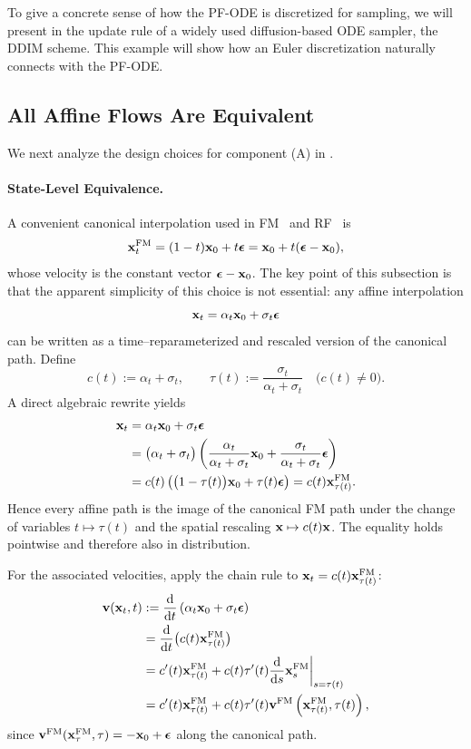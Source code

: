 To give a concrete sense of how the PF-ODE is discretized
for sampling, we will present in  the update rule of a
widely used diffusion-based ODE sampler, the DDIM scheme. This example will show how an Euler discretization naturally connects with the PF-ODE.







\subsection{All Affine Flows Are Equivalent}\label{subsec:all-flows-are-equiv}
We next analyze the design choices for component (A) in .

\paragraph{State-Level Equivalence.}
A convenient canonical interpolation used in FM~\citep{lipman2022flow} and RF~\citep{liu2022rectified} is
\[
{\mathbf{x}}_t^{\mathrm{FM}}=(1-t) {\mathbf{x}}_0+t {\bm{\epsilon}} = {\mathbf{x}}_{0}+t({\bm{\epsilon}}-{\mathbf{x}}_0),
\]
whose velocity is the constant vector ${\bm{\epsilon}}-{\mathbf{x}}_0$. The key point of this subsection is that the apparent simplicity of this choice is not essential: any affine interpolation
\[
{\mathbf{x}}_t=\alpha_t {\mathbf{x}}_0+\sigma_t {\bm{\epsilon}}
\]
can be written as a time–reparameterized and rescaled version of the canonical path. Define
\[
c(t):=\alpha_t+\sigma_t,
\qquad
\tau(t):=\frac{\sigma_t}{\alpha_t+\sigma_t}
\quad\big(c(t)\neq 0\big).
\]
A direct algebraic rewrite yields
\begin{align*}
{\mathbf{x}}_t
&=\alpha_t {\mathbf{x}}_0+\sigma_t {\bm{\epsilon}}
\\
&=\big(\alpha_t+\sigma_t\big) \left(\frac{\alpha_t}{\alpha_t+\sigma_t}{\mathbf{x}}_0+\frac{\sigma_t}{\alpha_t+\sigma_t}{\bm{\epsilon}}\right) \\
&=c(t) \left(\big(1-\tau(t)\big){\mathbf{x}}_0+\tau(t){\bm{\epsilon}}\right)
=c(t) {\mathbf{x}}_{\tau(t)}^{\mathrm{FM}}.
\end{align*}
Hence every affine path is the image of the canonical FM path under the change of variables $t\mapsto\tau(t)$ and the spatial rescaling ${\mathbf{x}}\mapsto c(t){\mathbf{x}}$. The equality holds pointwise and therefore also in distribution.

For the associated velocities, apply the chain rule to ${\mathbf{x}}_t=c(t){\mathbf{x}}_{\tau(t)}^{\mathrm{FM}}$:
\begin{align*}
{\mathbf{v}}({\mathbf{x}}_t,t)
&:= \frac{\mathop{}\!\mathrm{d}}{\mathop{}\!\mathrm{d} t}\left(\alpha_t{\mathbf{x}}_0 +\sigma_t {\bm{\epsilon}}\right)
\\&=\frac{\mathop{}\!\mathrm{d}}{\mathop{}\!\mathrm{d} t}\big(c(t){\mathbf{x}}_{\tau(t)}^{\mathrm{FM}}\big)
\\
&=c'(t) {\mathbf{x}}_{\tau(t)}^{\mathrm{FM}}+c(t) \tau'(t) \frac{\mathop{}\!\mathrm{d}}{\mathop{}\!\mathrm{d} s}{\mathbf{x}}^{\mathrm{FM}}_{s}\bigg|_{s=\tau(t)} \\
&=c'(t) {\mathbf{x}}_{\tau(t)}^{\mathrm{FM}}+c(t) \tau'(t) {\mathbf{v}}^{\mathrm{FM}} \left({\mathbf{x}}_{\tau(t)}^{\mathrm{FM}},\tau(t)\right),
\end{align*}
since ${\mathbf{v}}^{\mathrm{FM}}({\mathbf{x}}^{\mathrm{FM}}_{\tau},\tau)=-{\mathbf{x}}_0+{\bm{\epsilon}}$ along the canonical path.

